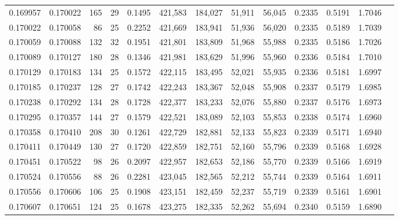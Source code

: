 \begin{tabular}{rrrrrrrrrrrrr}
0.169957 & 0.170022 & 165 &  29 &                                     0.1495 & 421,583 & 184,027 &  51,911 &  56,045 & 0.2335 & 0.5191 & 1.7046 \\
0.170022 & 0.170058 &  86 &  25 &                                     0.2252 & 421,669 & 183,941 &  51,936 &  56,020 & 0.2335 & 0.5189 & 1.7039 \\
0.170059 & 0.170088 & 132 &  32 &                                     0.1951 & 421,801 & 183,809 &  51,968 &  55,988 & 0.2335 & 0.5186 & 1.7026 \\
0.170089 & 0.170127 & 180 &  28 &                                     0.1346 & 421,981 & 183,629 &  51,996 &  55,960 & 0.2336 & 0.5184 & 1.7010 \\
0.170129 & 0.170183 & 134 &  25 &                                     0.1572 & 422,115 & 183,495 &  52,021 &  55,935 & 0.2336 & 0.5181 & 1.6997 \\
0.170185 & 0.170237 & 128 &  27 &                                     0.1742 & 422,243 & 183,367 &  52,048 &  55,908 & 0.2337 & 0.5179 & 1.6985 \\
0.170238 & 0.170292 & 134 &  28 &                                     0.1728 & 422,377 & 183,233 &  52,076 &  55,880 & 0.2337 & 0.5176 & 1.6973 \\
0.170295 & 0.170357 & 144 &  27 &                                     0.1579 & 422,521 & 183,089 &  52,103 &  55,853 & 0.2338 & 0.5174 & 1.6960 \\
0.170358 & 0.170410 & 208 &  30 &                                     0.1261 & 422,729 & 182,881 &  52,133 &  55,823 & 0.2339 & 0.5171 & 1.6940 \\
0.170411 & 0.170449 & 130 &  27 &                                     0.1720 & 422,859 & 182,751 &  52,160 &  55,796 & 0.2339 & 0.5168 & 1.6928 \\
0.170451 & 0.170522 &  98 &  26 &                                     0.2097 & 422,957 & 182,653 &  52,186 &  55,770 & 0.2339 & 0.5166 & 1.6919 \\
0.170524 & 0.170556 &  88 &  26 &                                     0.2281 & 423,045 & 182,565 &  52,212 &  55,744 & 0.2339 & 0.5164 & 1.6911 \\
0.170556 & 0.170606 & 106 &  25 &                                     0.1908 & 423,151 & 182,459 &  52,237 &  55,719 & 0.2339 & 0.5161 & 1.6901 \\
0.170607 & 0.170651 & 124 &  25 &                                     0.1678 & 423,275 & 182,335 &  52,262 &  55,694 & 0.2340 & 0.5159 & 1.6890 \\

\end{tabular}
